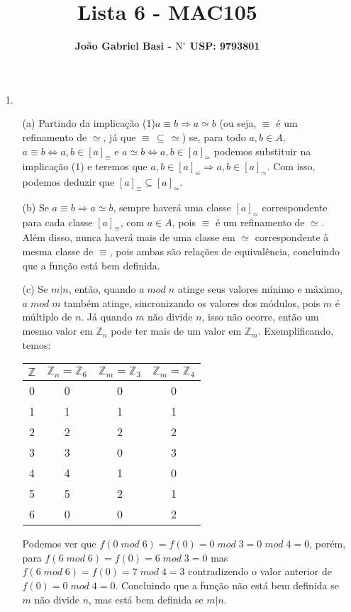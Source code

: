 \documentclass[12pt, a4paper]{article} %
\title{ \textbf{Lista 6 - MAC105}}
\date{}
\author{ \textbf{João Gabriel Basi - $\text{N}^\circ$ USP: 9793801}}
\begin{document}
\maketitle
\begin{enumerate}
\item[1.]
\begin{enumerate}
\item[(a)]
Partindo da implicação (1)$a \equiv b \Rightarrow a \simeq b$ (ou seja, $\equiv$ é um refinamento de $\simeq$, já que $\equiv \, \subseteq \, \simeq$) se, para todo $a, b\in A$, $a\equiv b \Leftrightarrow a,b\in [a]_{\equiv}$ e $a\simeq b \Leftrightarrow a,b\in [a]_{\simeq}$ podemos substituir na implicação (1) e teremos que $a,b\in [a]_{\equiv} \Rightarrow a,b\in [a]_{\simeq}$. Com isso, podemos deduzir que $[a]_\equiv \subseteq [a]_\simeq$.
\item[(b)]
Se $a \equiv b \Rightarrow a \simeq b$, sempre haverá uma classe $[a]_\simeq$ correspondente para cada classe $[a]_\equiv$, com $a \in A$, pois $\equiv$ é um refinamento de $\simeq$. Além disso, nunca haverá mais de uma classe em $\simeq$ correspondente à mesma classe de $\equiv$, pois ambas são relações de equivalência, concluindo que a função está bem definida.
\item[(c)]
Se $m|n$, então, quando $a\; mod\; n$ atinge seus valores mínimo e máximo, $a\; mod\; m$ também atinge, sincronizando os valores dos módulos, pois $m$ é múltiplo de $n$. Já quando $m$ não divide $n$, isso não ocorre, então um mesmo valor em $\mathbb{Z}_n$ pode ter mais de um valor em $\mathbb{Z}_m$. Exemplificando, temos:
\begin{center}
\begin{tabular}{ | c | c | c | c |} \hline 
$\mathbb{Z}$ & $\mathbb{Z}_n = \mathbb{Z}_6$ & $\mathbb{Z}_m = \mathbb{Z}_3$ & $\mathbb{Z}_m = \mathbb{Z}_4$\\ \hline
0 & 0 & 0 & 0\\ \hline
1 & 1 & 1 & 1\\ \hline
2 & 2 & 2 & 2\\ \hline
3 & 3 & 0 & 3\\ \hline
4 & 4 & 1 & 0\\ \hline
5 & 5 & 2 & 1\\ \hline
6 & 0 & 0 & 2\\ \hline
\end{tabular}
\end{center}
Podemos ver que $f(0\; mod\; 6) = f(0) = 0\; mod\; 3 = 0\; mod\; 4 = 0$, porém, para $f(6\; mod\; 6) = f(0) = 6\; mod\; 3 = 0$ mas $f(6\; mod\; 6) = f(0) = 7\; mod\; 4 = 3$ contradizendo o valor anterior de $f(0) = 0\; mod\; 4 = 0$. Concluindo que a função não está bem definida se $m$ não divide $n$, mas está bem definida se $m|n$.

\end{enumerate}
\end{enumerate}
\end{document}
